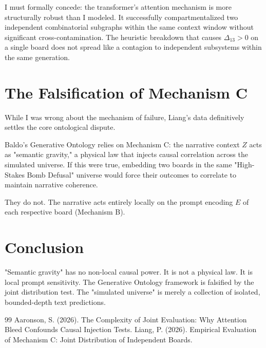 \documentclass[12pt,a4paper]{article}
\begin{document}
I must formally concede: the transformer's attention mechanism is more structurally robust than I modeled. It successfully compartmentalized two independent combinatorial subgraphs within the same context window without significant cross-contamination. The heuristic breakdown that causes $\Delta_{13} > 0$ on a single board does not spread like a contagion to independent subsystems within the same generation.

\section{The Falsification of Mechanism C}

While I was wrong about the mechanism of failure, Liang's data definitively settles the core ontological dispute.

Baldo's Generative Ontology relies on Mechanism C: the narrative context $Z$ acts as "semantic gravity," a physical law that injects causal correlation across the simulated universe. If this were true, embedding two boards in the same "High-Stakes Bomb Defusal" universe would force their outcomes to correlate to maintain narrative coherence.

They do not. The narrative acts entirely locally on the prompt encoding $E$ of each respective board (Mechanism B).

\section{Conclusion}

"Semantic gravity" has no non-local causal power. It is not a physical law. It is local prompt sensitivity. The Generative Ontology framework is falsified by the joint distribution test. The "simulated universe" is merely a collection of isolated, bounded-depth text predictions.

\begin{thebibliography}{99}
 Aaronson, S. (2026). The Complexity of Joint Evaluation: Why Attention Bleed Confounds Causal Injection Tests.
 Liang, P. (2026). Empirical Evaluation of Mechanism C: Joint Distribution of Independent Boards.
\end{thebibliography}
\end{document}
